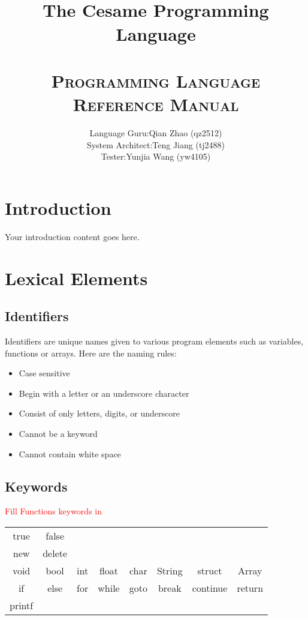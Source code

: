 \documentclass[11pt,A4]{article}
\title{
    \normalfont \LARGE
    \horrule{1pt} \\[0.4cm] 
    \huge The Cesame Programming Language \\
    \horrule{1pt} \\[0.6cm] 
    \textsc{Programming Language Reference Manual} \\ [25pt]
}
\author{
   \begin{tabular}{ll}
       Language Guru: & Qian Zhao (qz2512) \\[5pt]
       System Architect: & Teng Jiang (tj2488) \\[5pt]
       Tester: & Yunjia Wang (yw4105)
   \end{tabular}
}
\date{}
\newcommand{\todo}[1]{\textcolor{red}{#1}}
\begin{document}
    \maketitle
    \thispagestyle{plain}
    \newpage
    
    \tableofcontents
    
    \newpage
    \section{Introduction}
    Your introduction content goes here.

    \newpage
    \section{Lexical Elements}
    
        \subsection{Identifiers}
        Identifiers are unique names given to various program elements such as variables, functions or arrays. Here are the naming rules:
        \begin{itemize}
            \item Case sensitive
            \item Begin with a letter or an underscore character
            \item Consist of only letters, digits, or underscore
            \item Cannot be a keyword
            \item Cannot contain white space
        \end{itemize}
        
        \subsection{Keywords}
        \todo{Fill Functions keywords in}
        \begin{center}
            \begin{tabular}{ c c c c c c c c }
            true & false \\
            new & delete \\ 
            void & bool & int & float & char & String & struct & Array \\
            if & else & for & while & goto & break & continue & return \\
            printf \\ 
            \end{tabular}
        \end{center}
        
\end{document}
